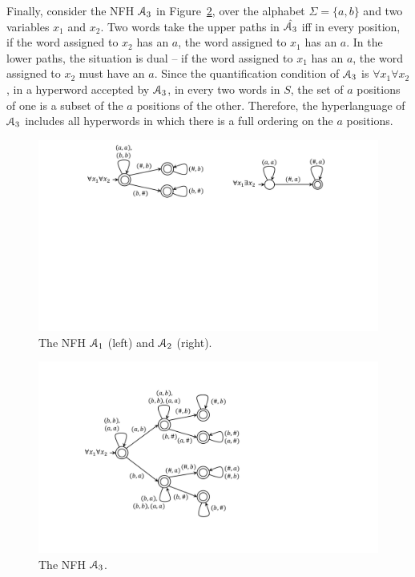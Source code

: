 \begin{example}
Finally, consider the NFH $\mathcal{A}_3$ in Figure~\ref{fig:ordered}, over the alphabet $\Sigma = \{a,b\}$ and two variables $x_1$ and $x_2$. Two words take the upper paths in $\hat{\mathcal{A}_3}$ iff in every position, if the word assigned to $x_2$ has an $a$, the word assigned to $x_1$ has an $a$. In the lower paths, the situation is dual -- if the word assigned to $x_1$ has an $a$, the word assigned to $x_2$ must have an $a$. 
Since the quantification condition of $\mathcal{A}_3$ is $\forall x_1\forall x_2$, in a hyperword accepted by $\mathcal{A}_3$, in every two words in $S$, the set of $a$ positions of one is a subset of the $a$ positions of the other. Therefore, the hyperlanguage of $\mathcal{A}_3$ includes all hyperwords in which there is a full ordering on the $a$ positions. 

\begin{figure}[ht]
    \begin{center}
        \includegraphics[scale=0.5]{figures/examples.pdf}
    \end{center}
    \caption{The NFH $\mathcal{A}_1$ (left) and $\mathcal{A}_2$ (right).}
    \label{fig:nfh_examples}
\end{figure}


\begin{figure}[ht]
    \begin{center}
        \includegraphics[scale=0.5]{figures/a_implies_a.pdf}
    \end{center}
    \caption{The NFH $\mathcal{A}_3$.}
    \label{fig:ordered}
\end{figure}
\end{example}



